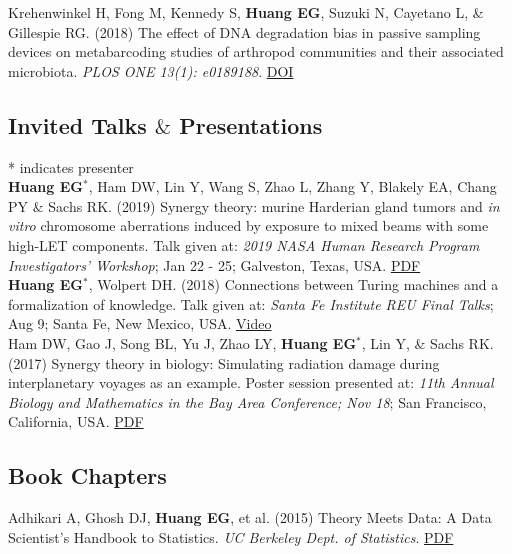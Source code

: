 \documentclass[10pt, letterpaper]{article}
\newcommand{\years}[1]{\marginnote{\scriptsize #1}}
\begin{document}
\years{2018}Krehenwinkel H, Fong M, Kennedy S, \textbf{Huang EG}, Suzuki N, Cayetano L, \& Gillespie RG. (2018) The effect of DNA degradation bias in passive sampling devices on metabarcoding studies of arthropod communities and their associated microbiota. \emph{PLOS ONE 13(1): e0189188}. \href{https://doi.org/10.1371/journal.pone.0189188}{DOI} \\

\subsection*{Invited Talks $\&$ Presentations}
* indicates presenter\\


\noindent
\years{2019}\textbf{Huang EG}$^{*}$, Ham DW, Lin Y, Wang S, Zhao L, Zhang Y, Blakely EA, Chang PY $\&$ Sachs RK. (2019) Synergy theory: murine Harderian gland tumors and \textit{in vitro} chromosome aberrations induced by exposure to mixed beams with some high-LET components. Talk given at: \emph{2019 NASA Human Research Program Investigators' Workshop}; Jan 22 - 25; Galveston, Texas, USA. \href{http://cdn-uploads.preciscentral.com/Download/Submissions/D7DB3F75E6939F5F/4BD4D7683C0AB651.pdf}{PDF} \\

\years{2018}\textbf{Huang EG}$^{*}$, Wolpert DH. (2018) Connections between Turing machines and a formalization of knowledge. Talk given at: \emph{Santa Fe Institute REU Final Talks}; Aug 9; Santa Fe, New Mexico, USA. \href{https://www.youtube.com/watch?v=10bi_R47uYw&list=PLZlVBTf7N6GpTwEeQOlOmIfYN5J7zciZR&index=6&t=0s}{Video}\\

\years{2017}Ham DW, Gao J, Song BL, Yu J, Zhao LY, \textbf{Huang EG}$^{*}$, Lin Y, \& Sachs RK. (2017) Synergy theory in biology: Simulating radiation damage during interplanetary voyages as an example. Poster session presented at: \emph{11th Annual Biology and Mathematics in the Bay Area Conference; Nov 18}; San Francisco, California, USA. \href{https://nbviewer.jupyter.org/github/sachsURAP/BaMBA_11/blob/master/Bamba17v3.pdf}{PDF}\\

\subsection*{Book Chapters}
\noindent
\years{2015}Adhikari A, Ghosh DJ, \textbf{Huang EG}, et al. (2015) Theory Meets Data: A Data Scientist’s Handbook to Statistics. \emph{UC Berkeley Dept. of Statistics}. {\href{https://nbviewer.jupyter.org/github/eghuang/theory_meets_data/blob/master/theory-meets-data.pdf}{PDF}}\\
\end{document}
